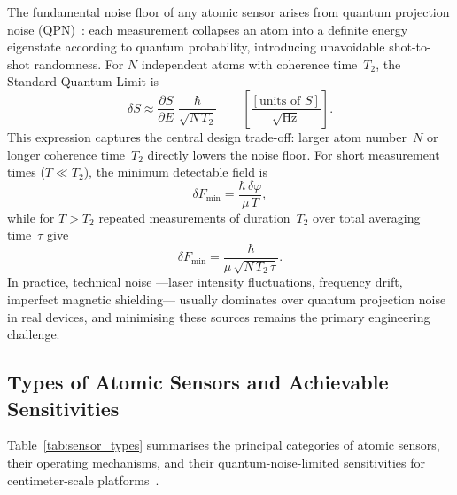 The fundamental noise floor of any atomic sensor arises from
quantum projection noise (QPN)~\cite{kitching2011,brown2025}: each
measurement collapses an atom into a definite energy eigenstate
according to quantum probability, introducing unavoidable
shot-to-shot randomness. For $N$ independent atoms with
coherence time~$T_2$, the Standard Quantum Limit is
\begin{equation}
    \delta S \approx \frac{\partial S}{\partial E}\;
                     \frac{\hbar}{\sqrt{N\,T_2}}
    \qquad\left[\frac{[\text{units of }S]}{\sqrt{\text{Hz}}}\right].
    \label{eq:sql}
\end{equation}
This expression captures the central design trade-off: larger atom
number~$N$ or longer coherence time~$T_2$ directly lowers the noise
floor. For short measurement times ($T \ll T_2$), the minimum
detectable field is
\begin{equation}
    \delta F_\text{min} = \frac{\hbar\,\delta\varphi}{\mu\,T},
\end{equation}
while for $T > T_2$ repeated measurements of duration~$T_2$ over
total averaging time~$\tau$ give
\begin{equation}
    \delta F_\text{min} = \frac{\hbar}{\mu\,\sqrt{N\,T_2\,\tau}}.
\end{equation}
In practice, technical noise ---laser intensity fluctuations,
frequency drift, imperfect magnetic shielding--- usually dominates
over quantum projection noise in real devices, and minimising these
sources remains the primary engineering challenge.
\subsection{Types of Atomic Sensors and Achievable Sensitivities}
\label{sec:sensor_types}

Table~\ref{tab:sensor_types} summarises the principal categories
of atomic sensors, their operating mechanisms, and their
quantum-noise-limited sensitivities for centimeter-scale
platforms~\cite{kitching2011,brown2025}.

